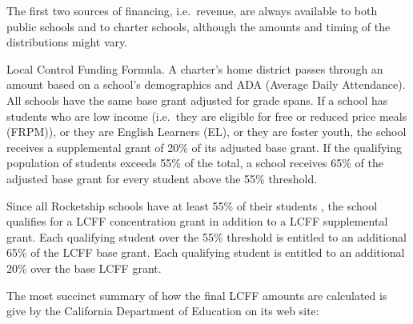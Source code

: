 The first two sources of financing, i.e.~revenue, are always available to both public schools and to charter schools, although the amounts and timing of the distributions might vary. 

\begin{description}[nosep]\OnehalfSpacing%
  \medskip\item[LCFF] Local Control Funding Formula. A charter's home district passes through an amount based on a school's demographics and ADA (Average Daily Attendance). All schools have the same base grant adjusted for grade spans.  If a school has students who are low income (i.e.~they are eligible for free or reduced price meals (FRPM)), or they are English Learners (EL), or they are foster youth, the school receives a supplemental grant of 20\% of its adjusted base grant. If the qualifying population of students exceeds 55\% of the total, a school receives 65\% of the adjusted base grant for every student above the 55\% threshold.

Since all Rocketship schools have at least 55\% of their students , the school qualifies for a LCFF concentration grant in addition to a LCFF supplemental grant. Each qualifying student over the 55\% threshold is entitled to an additional 65\% of the LCFF base grant. Each qualifying student is entitled to an additional 20\% over the base LCFF grant. 

The most succinct summary of how the final LCFF amounts are calculated is give by the California Department of Education on its web site:


\end{description}
